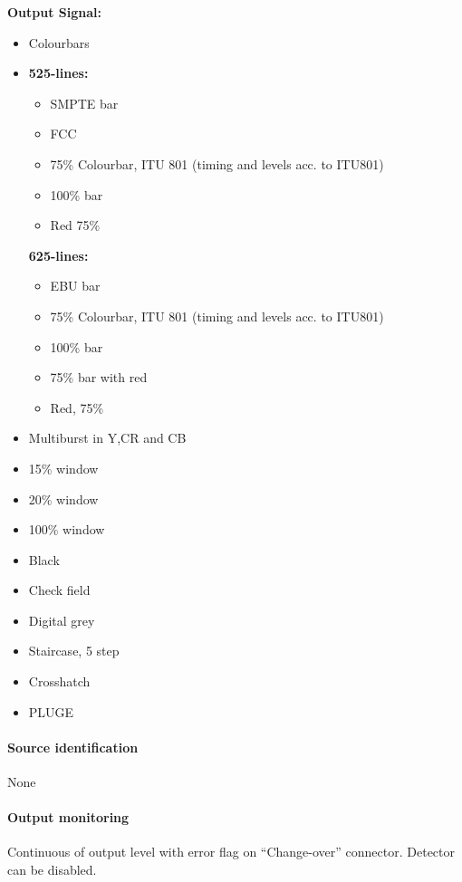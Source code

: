 \textbf{Output Signal:}
\begin{itemize}
\setlength{\itemsep}{1pt}
\setlength{\parskip}{0pt}

\item Colourbars

\item \textbf{525-lines:}
\begin{itemize}
\item SMPTE bar
\item FCC
\item 75\% Colourbar, ITU 801 (timing and levels acc. to ITU801)
\item 100\% bar
\item Red 75\%
\end{itemize}

\textbf{625-lines:}
\begin{itemize}
\item EBU bar
\item 75\% Colourbar, ITU 801 (timing and levels acc. to ITU801)
\item 100\% bar
\item 75\% bar with red
\item Red, 75\%
\end{itemize}

\item Multiburst in Y,CR and CB
\item 15\% window
\item 20\% window
\item 100\% window
\item Black
\item Check field
\item Digital grey
\item Staircase, 5 step
\item Crosshatch
\item PLUGE
\end{itemize}


\paragraph{Source identification}
None

\paragraph{Output monitoring}
Continuous of output level with error flag on ``Change-over'' connector. Detector can be disabled.
